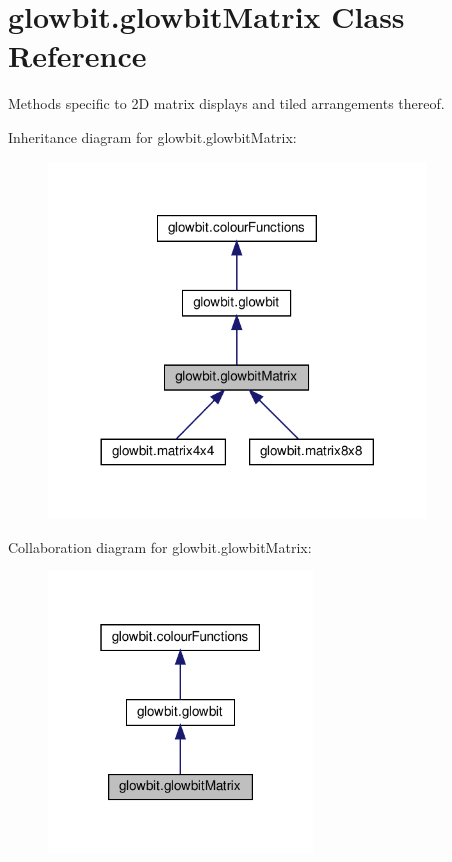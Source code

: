 \hypertarget{classglowbit_1_1glowbitMatrix}{}\section{glowbit.\+glowbit\+Matrix Class Reference}
\label{classglowbit_1_1glowbitMatrix}


Methods specific to 2D matrix displays and tiled arrangements thereof.  




Inheritance diagram for glowbit.\+glowbit\+Matrix\+:\nopagebreak
\begin{figure}[H]
\begin{center}
\leavevmode
\includegraphics[width=284pt]{classglowbit_1_1glowbitMatrix__inherit__graph}
\end{center}
\end{figure}


Collaboration diagram for glowbit.\+glowbit\+Matrix\+:\nopagebreak
\begin{figure}[H]
\begin{center}
\leavevmode
\includegraphics[width=199pt]{classglowbit_1_1glowbitMatrix__coll__graph}
\end{center}
\end{figure}
